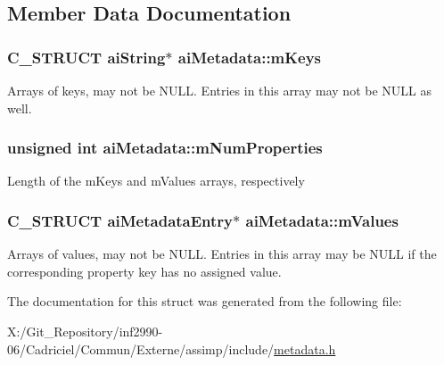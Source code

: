 \subsection{Member Data Documentation}
\hypertarget{structai_metadata_aa8c77a263443658737ee51a74e3c292e}{
\subsubsection[{m\-Keys}]{\setlength{\rightskip}{0pt plus 5cm}C\-\_\-\-S\-T\-R\-U\-C\-T {\bf ai\-String}$\ast$ ai\-Metadata\-::m\-Keys}}\label{structai_metadata_aa8c77a263443658737ee51a74e3c292e}
Arrays of keys, may not be N\-U\-L\-L. Entries in this array may not be N\-U\-L\-L as well. \hypertarget{structai_metadata_a32c4587c53dd402a5878ffc94088e528}{
\subsubsection[{m\-Num\-Properties}]{\setlength{\rightskip}{0pt plus 5cm}unsigned int ai\-Metadata\-::m\-Num\-Properties}}\label{structai_metadata_a32c4587c53dd402a5878ffc94088e528}
Length of the m\-Keys and m\-Values arrays, respectively \hypertarget{structai_metadata_a34b515fcb5b806c471d3c6ce7bc76beb}{
\subsubsection[{m\-Values}]{\setlength{\rightskip}{0pt plus 5cm}C\-\_\-\-S\-T\-R\-U\-C\-T {\bf ai\-Metadata\-Entry}$\ast$ ai\-Metadata\-::m\-Values}}\label{structai_metadata_a34b515fcb5b806c471d3c6ce7bc76beb}
Arrays of values, may not be N\-U\-L\-L. Entries in this array may be N\-U\-L\-L if the corresponding property key has no assigned value. 

The documentation for this struct was generated from the following file\-:\begin{DoxyCompactItemize}
\item 
X\-:/\-Git\-\_\-\-Repository/inf2990-\/06/\-Cadriciel/\-Commun/\-Externe/assimp/include/\hyperlink{metadata_8h}{metadata.\-h}\end{DoxyCompactItemize}

